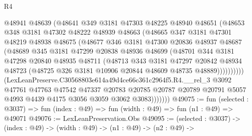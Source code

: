 \begin{lexlean}{R4}
\begin{coremodule}
                    @48941
                    @48639
                    (@48641
                      @349
                      @3181
                      @47303
                      @48225
                      @48940
                      @48651
                      (@48653
                        @348
                        @3181
                        @47302
                        @48222
                        @48939
                        @48663
                        (@48665
                          @347
                          @3181
                          @47301
                          @48219
                          @48938
                          @48675
                          (@48677
                            @346
                            @3181
                            @47300
                            @20836
                            @48937
                            @48687
                            (@48689
                              @345
                              @3181
                              @47299
                              @20838
                              @48936
                              @48699
                              (@48701
                                @344
                                @3181
                                @47298
                                @20840
                                @48935
                                @48711
                                (@48713
                                  @343
                                  @3181
                                  @47297
                                  @20842
                                  @48934
                                  @48723
                                  (@48725 @326 @3181 @10906 @20844 @48609 @48735 @48889))))))))))
                (LexLeanPreserve.C30568803e614a49d4ce66c361c2964f5.R4.__rel_3
                  @3092
                  @47761
                  @47763
                  @47542
                  @47337
                  @20783
                  @20785
                  @20787
                  @20789
                  @20791
                  @5057
                  @4993
                  @4439
                  @4175
                  @3056
                  @3059
                  @3062
                  @3083)))))))
@49075 := fun (selected : @3037) =>
  fun (index : @49) => fun (width : @49) => fun (n1 : @49) => @49071
@49076 := LexLeanPreservation.Obs
@49095 := (selected : @3037) ->
  (index : @49) ->
  (width : @49) ->
  (n1 : @49) ->
  (n2 : @49) ->

\end{coremodule}
\end{lexlean}

